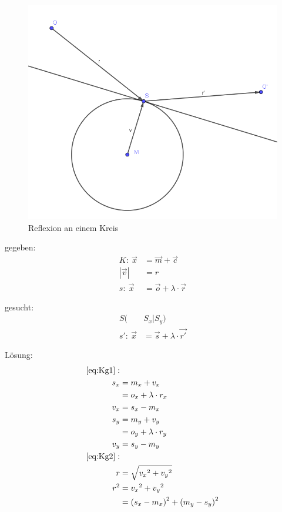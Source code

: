 \documentclass[reducespace,stylepage,semiarbeit]{spezidoc}
\begin{document}
\begin{figure}[h]
\centering
\includegraphics[scale=0.5]{pictures/CircleRef.png}
\caption{Reflexion an einem Kreis}
\end{figure}

gegeben:
\begin{subequations}
\begin{align}
K:~ \vec{x} &= \vec{m} + \vec{c} \label{eq:Kg1}\\
|\vec{v}| &= r \label{eq:Kg2} \\
s:~ \vec{x} &= \vec{o} + \lambda \cdot \vec{r} \label{eq:Kg3}
\end{align}
\end{subequations}

gesucht:
\begin{subequations}
\begin{align}
S(&S_x|S_y) \nonumber \\
s':~ \vec{x} &= \vec{s} + \lambda \cdot \vec{r'} \nonumber 
\end{align}
\end{subequations}

Lösung:
\begin{equation*}
\begin{split}
\ref{eq:Kg1}: &\\
s_x &= m_x + v_x \\
 &= o_x + \lambda \cdot r_x \\
v_x &= s_x - m_x \\
s_y &= m_y + v_y \\
 &= o_y + \lambda \cdot r_y \\
v_y &= s_y - m_y \\
\ref{eq:Kg2}: & \\
r &= \sqrt{{v_x}^2 + {v_y}^2} \\
r^2 &= {v_x}^2 + {v_y}^2 \\
 &= {(s_x - m_x)}^2 + {(m_y - s_y)}^2 
\end{split}
\end{equation*}
\end{document}
